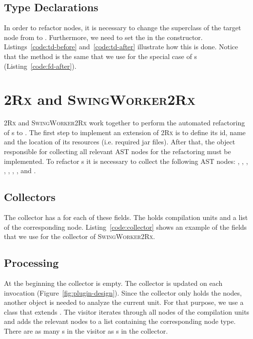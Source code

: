 \documentclass[type=bsc,accentcolor=tud9c]{tudthesis}
\newcommand{\toolcore}{\textsc{2Rx}}
\newcommand{\toolextension}{\textsc{SwingWorker2Rx}}
\begin{document}


\subsection{Type Declarations}
In order to refactor  nodes, it is necessary to change the superclass of the target node from  to . Furthermore, we need to set the  in the constructor. Listings~\ref{code:td-before} and~\ref{code:td-after} illustrate how this is done. Notice that the method  is the same that we use for the special case of s (Listing~\ref{code:fd-after}).



\section{\toolcore{} and \toolextension{}}
\toolcore{} and \toolextension{} work together to perform the automated refactoring of s to . The first step to implement an extension of \toolcore{} is to define its id, name and the location of its resources (i.e. required jar files). After that, the object responsible for collecting all relevant AST nodes for the refactoring must be implemented. To refactor s it is necessary to collect the following AST nodes: , , , , , , ,  and .


\subsection{Collectors}
The collector has a  for each of these fields. The  holds compilation units and a list of the corresponding node. Listing~\ref{code:collector} shows an example of the fields that we use for the collector of \toolextension{}.



\subsection{Processing}
At the beginning the collector is empty. The collector is updated on each  invocation (Figure~\ref{fig:plugin-design}). Since the collector only holds the nodes, another object is needed to analyze the current unit. For that purpose, we use a class that extends . The visitor iterates through all nodes of the compilation units and adds the relevant nodes to a list containing the corresponding node type. There are as many s in the visitor as s in the collector.
\end{document}
